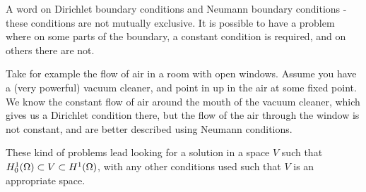 A word on Dirichlet boundary conditions and Neumann boundary 
conditions - these conditions are not mutually exclusive.
It is possible to have a problem where on some parts of the boundary, 
a constant condition is required, and on others there are not.

Take for example the flow of air in a room with open windows. 
Assume you have a (very powerful) vacuum cleaner,
 and point in up in the air at some fixed point. 
We know the constant flow of air around the mouth of the vacuum cleaner, which 
gives us a Dirichlet condition there, but the flow of the air through the 
window is not constant, and are better described using Neumann conditions.

These kind of problems lead looking for a solution in a space $V$ such that 
$H^1_0(\Omega) \subset V \subset H^1(\Omega)$, with any other conditions used such 
that $V$ is an appropriate space.